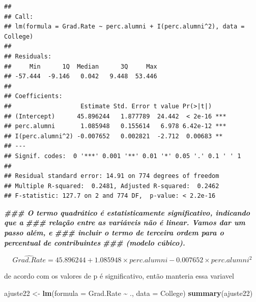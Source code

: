\documentclass[
]{article}
\newenvironment{Shaded}{\begin{snugshade}}{\end{snugshade}}
\newcommand{\AttributeTok}[1]{\textcolor[rgb]{0.13,0.29,0.53}{#1}}
\newcommand{\DocumentationTok}[1]{\textcolor[rgb]{0.56,0.35,0.01}{\textbf{\textit{#1}}}}
\newcommand{\FunctionTok}[1]{\textcolor[rgb]{0.13,0.29,0.53}{\textbf{#1}}}
\newcommand{\NormalTok}[1]{#1}
\newcommand{\OtherTok}[1]{\textcolor[rgb]{0.56,0.35,0.01}{#1}}
\newcommand{\SpecialCharTok}[1]{\textcolor[rgb]{0.81,0.36,0.00}{\textbf{#1}}}
\begin{document}
\begin{verbatim}
## 
## Call:
## lm(formula = Grad.Rate ~ perc.alumni + I(perc.alumni^2), data = College)
## 
## Residuals:
##     Min      1Q  Median      3Q     Max 
## -57.444  -9.146   0.042   9.448  53.446 
## 
## Coefficients:
##                   Estimate Std. Error t value Pr(>|t|)    
## (Intercept)      45.896244   1.877789  24.442  < 2e-16 ***
## perc.alumni       1.085948   0.155614   6.978 6.42e-12 ***
## I(perc.alumni^2) -0.007652   0.002821  -2.712  0.00683 ** 
## ---
## Signif. codes:  0 '***' 0.001 '**' 0.01 '*' 0.05 '.' 0.1 ' ' 1
## 
## Residual standard error: 14.91 on 774 degrees of freedom
## Multiple R-squared:  0.2481, Adjusted R-squared:  0.2462 
## F-statistic: 127.7 on 2 and 774 DF,  p-value: < 2.2e-16
\end{verbatim}

\begin{Shaded}
\begin{Highlighting}[]
\DocumentationTok{\#\#\# O termo quadrático é estatisticamente significativo, indicando que a}
\DocumentationTok{\#\#\# relação entre as variáveis não é linear. Vamos dar um passo além, e}
\DocumentationTok{\#\#\# incluir o termo de terceira ordem para o percentual de contribuintes}
\DocumentationTok{\#\#\# (modelo cúbico).}
\end{Highlighting}
\end{Shaded}

\[
\hat{Grad.Rate} = 45.896244 + 1.085948 \times perc.alumni -0.007652 \times perc.alumni^2
\]

de acordo com os valores de p é significativo, então manteria essa
variavel

\begin{Shaded}
\begin{Highlighting}[]
\NormalTok{ajuste22 }\OtherTok{\textless{}{-}} \FunctionTok{lm}\NormalTok{(}\AttributeTok{formula =}\NormalTok{ Grad.Rate }\SpecialCharTok{\textasciitilde{}}\NormalTok{ ., }\AttributeTok{data =}\NormalTok{ College)}
\FunctionTok{summary}\NormalTok{(ajuste22)}
\end{Highlighting}
\end{Shaded}
\end{document}
